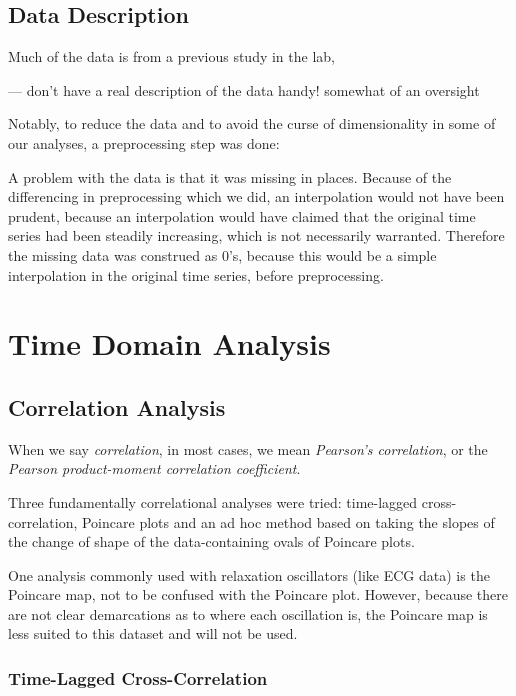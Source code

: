 \documentclass[12pt]{article}
\begin{document}
\subsection{Data Description}

Much of the data is from a previous study in the lab, %

--- don't have a real description of the data handy! somewhat of an oversight

Notably, to reduce the data and to avoid the curse of dimensionality in some of our analyses, a preprocessing step was done: %

A problem with the data is that it was missing in places. Because of the differencing in preprocessing which we did, an interpolation would not have been prudent, because an interpolation would have claimed that the original time series had been steadily increasing, which is not necessarily warranted. Therefore the missing data was construed as 0's, because this would be a simple interpolation in the original time series, before preprocessing.

\section{Time Domain Analysis}

\subsection{Correlation Analysis}

When we say \emph{correlation}, in most cases, we mean \emph{Pearson's correlation}, or the \emph{Pearson product-moment correlation coefficient}.

Three fundamentally correlational analyses were tried: time-lagged cross-correlation, Poincare plots and an ad hoc method based on taking the slopes of the change of shape of the data-containing ovals of Poincare plots.

One analysis commonly used with relaxation oscillators (like ECG data) is the Poincare map, not to be confused with the Poincare plot. However, because there are not clear demarcations as to where each oscillation is, the Poincare map is less suited to this dataset and will not be used\cite{physsync}.

\subsubsection{Time-Lagged Cross-Correlation}
\end{document}
